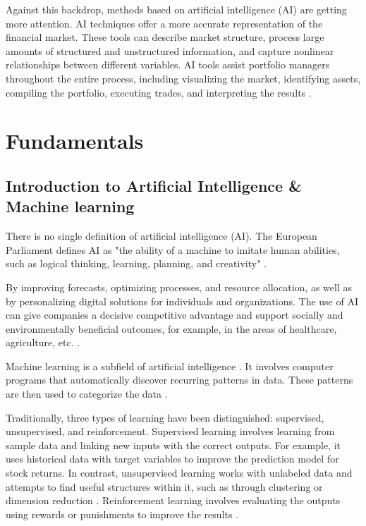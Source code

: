\documentclass{agasthesis}
\begin{document}
Against this backdrop, methods based on artificial intelligence (AI) are getting more attention. AI techniques offer a more accurate representation of the financial market. 
These tools can describe market structure, process large amounts of structured and unstructured information, and capture nonlinear relationships between different variables. 
AI tools assist portfolio managers throughout the entire process, 
including visualizing the market, identifying assets, compiling the portfolio, executing trades, and interpreting the results \cite{sutiene_enhancing_2024}.
\chapter{Fundamentals}
\section{Introduction to Artificial Intelligence & Machine learning}
There is no single definition of artificial intelligence (AI). The European Parliament defines AI as "the ability of a machine to imitate human abilities, 
such as logical thinking, learning, planning, and creativity" \cite[p. 98]{seidel_banking_2025}.

By improving forecasts, optimizing processes, and resource allocation, as well as by personalizing digital solutions for individuals and organizations. 
The use of AI can give companies a decisive competitive advantage and support socially and environmentally beneficial outcomes, 
for example, in the areas of healthcare, agriculture, etc. \cite{radley-gardner_fundamental_2016}.

Machine learning is a subfield of artificial intelligence \cite[p. 19]{russell_artificial_2022}. It involves computer programs that automatically discover recurring patterns in data. 
These patterns are then used to categorize the data \cite[p. 1]{bishop_pattern_2006}.

Traditionally, three types of learning have been distinguished: supervised, unsupervised, and reinforcement. 
Supervised learning involves learning from sample data and linking new inputs with the correct outputs. 
For example, it uses historical data with target variables to improve the prediction model for stock returns. 
In contrast, unsupervised learning works with unlabeled data and attempts to find useful structures within it, such as through clustering or dimension reduction \cite{goodfellow_generative_2020}. 
Reinforcement learning involves evaluating the outputs using rewards or punishments to improve the results \cite{stiennon_learning_2020}.
\end{document}
